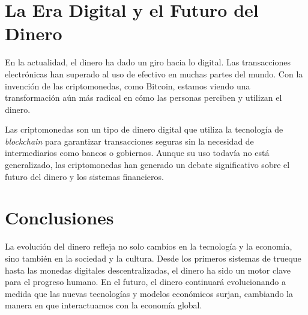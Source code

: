 	\section{La Era Digital y el Futuro del Dinero}

	En la actualidad, el dinero ha dado un giro hacia lo digital. Las transacciones electrónicas han superado al uso de efectivo en muchas partes del mundo. Con la invención de las criptomonedas, como Bitcoin, estamos viendo una transformación aún más radical en cómo las personas perciben y utilizan el dinero.

	Las criptomonedas son un tipo de dinero digital que utiliza la tecnología de \textit{blockchain} para garantizar transacciones seguras sin la necesidad de intermediarios como bancos o gobiernos. Aunque su uso todavía no está generalizado, las criptomonedas han generado un debate significativo sobre el futuro del dinero y los sistemas financieros.

	\begin{mdframed}[backgroundcolor=gray!10,linewidth=2pt]
		\centering
	\end{mdframed}

	\section{Conclusiones}

	La evolución del dinero refleja no solo cambios en la tecnología y la economía, sino también en la sociedad y la cultura. Desde los primeros sistemas de trueque hasta las monedas digitales descentralizadas, el dinero ha sido un motor clave para el progreso humano. En el futuro, el dinero continuará evolucionando a medida que las nuevas tecnologías y modelos económicos surjan, cambiando la manera en que interactuamos con la economía global.

